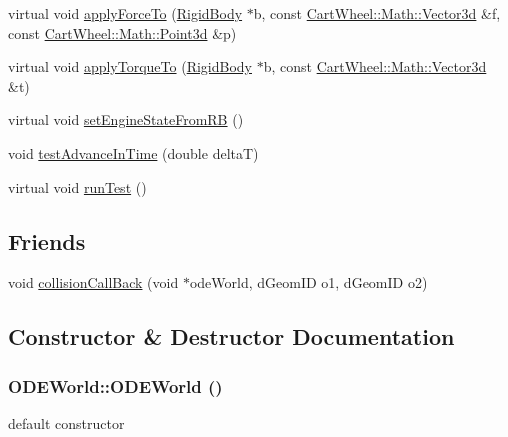 \begin{DoxyCompactItemize}
virtual void \hyperlink{classCartWheel_1_1Physics_1_1ODEWorld_a7a8c8fc31b0dac181d6d397cd6b70e06}{applyForceTo} (\hyperlink{classCartWheel_1_1Physics_1_1RigidBody}{RigidBody} $\ast$b, const \hyperlink{classCartWheel_1_1Math_1_1Vector3d}{CartWheel::Math::Vector3d} \&f, const \hyperlink{classCartWheel_1_1Math_1_1Point3d}{CartWheel::Math::Point3d} \&p)
\item 
virtual void \hyperlink{classCartWheel_1_1Physics_1_1ODEWorld_a99608efa452523e74cc61cd7cbafb496}{applyTorqueTo} (\hyperlink{classCartWheel_1_1Physics_1_1RigidBody}{RigidBody} $\ast$b, const \hyperlink{classCartWheel_1_1Math_1_1Vector3d}{CartWheel::Math::Vector3d} \&t)
\item 
virtual void \hyperlink{classCartWheel_1_1Physics_1_1ODEWorld_a4413b4b3d3918f05ef2c5fbda8da9af2}{setEngineStateFromRB} ()
\item 
void \hyperlink{classCartWheel_1_1Physics_1_1ODEWorld_a3989f16bd09d91d2ebf773567ac39e6d}{testAdvanceInTime} (double deltaT)
\item 
virtual void \hyperlink{classCartWheel_1_1Physics_1_1ODEWorld_a24befdbc6e6997f125d65b649c5b8fde}{runTest} ()
\end{DoxyCompactItemize}
\subsection*{Friends}
\begin{DoxyCompactItemize}
\item 
void \hyperlink{classCartWheel_1_1Physics_1_1ODEWorld_a0119980a84afa8b21900e6df9a269913}{collisionCallBack} (void $\ast$odeWorld, dGeomID o1, dGeomID o2)
\end{DoxyCompactItemize}


\subsection{Constructor \& Destructor Documentation}
\hypertarget{classCartWheel_1_1Physics_1_1ODEWorld_ae66e4bf441a399e71321b31206b56c6d}{
\subsubsection[{ODEWorld}]{\setlength{\rightskip}{0pt plus 5cm}ODEWorld::ODEWorld ()}}
\label{classCartWheel_1_1Physics_1_1ODEWorld_ae66e4bf441a399e71321b31206b56c6d}
default constructor


